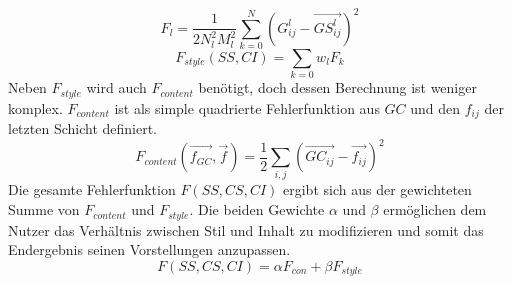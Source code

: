\documentclass[times, 11pt,twocolumn]{article}
\begin{document}
\footnotesize
\begin{equation}
F_l= \frac{1}{2N_l^2M_l^2}\sum_{k=0}^N (G_{ij}^l- \vec{GS_{ij}^l})^2
\label{eq:DeepStyleCorrErr}
\end{equation}
\small
\footnotesize
\begin{equation}
F_{style}(SS,CI)= \sum_{k=0} w_l F_k
\label{eq:DeepStyleStyleErr}
\end{equation}
\small
Neben $F_{style}$ wird auch $F_{content}$ benötigt, doch dessen Berechnung ist weniger komplex. $F_{content}$ ist als simple quadrierte Fehlerfunktion aus $GC$ und den $f_{ij}$ der letzten Schicht definiert. 
\footnotesize
\begin{equation}
F_{content}(\vec{f_{GC}}, \vec{f})= \frac{1}{2}\sum_{i,j}(\vec{GC_{ij}}- \vec{f_{ij}})^2
\label{eq:DeepStyleContError}
\end{equation}
\small
Die gesamte Fehlerfunktion $F(SS,CS,CI)$ ergibt sich aus der gewichteten Summe von $F_{content}$ und $F_{style}$. Die beiden Gewichte $\alpha$ und $\beta$ ermöglichen dem Nutzer das Verhältnis zwischen Stil und Inhalt zu modifizieren und somit das Endergebnis seinen Vorstellungen anzupassen. 
\footnotesize
\begin{equation}
F (SS,CS,CI)= \alpha F_{con}+\beta F_{style}
\label{eq:DeepStyleErr}
\end{equation}
\small
\end{document}
